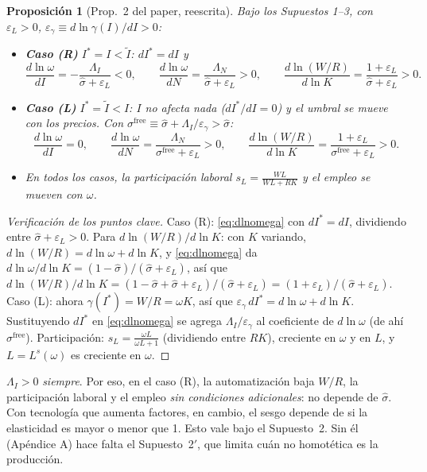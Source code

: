 \documentclass[11pt,a4paper]{article}
\theoremstyle{definition}
\theoremstyle{plain}
\newtheorem{proposicion}{Proposición}
\theoremstyle{remark}
\numberwithin{equation}{section}
\newcommand{\sh}{\hat\sigma}
\newcommand{\It}{\tilde I}
\newcommand{\Is}{I^{*}}
\newcommand{\sfree}{\sigma^{\mathrm{free}}}
\newcommand{\eps}{\varepsilon}
\begin{document}
\begin{proposicion}[Prop.~2 del paper, reescrita]
Bajo los Supuestos 1–3, con $\eps_L>0$, $\eps_\gamma\equiv d\ln\gamma(I)/dI>0$:
\begin{itemize}[nosep]
  \item \textbf{Caso (R)} $\Is=I<\It$: $d\Is=dI$ y
    \[\frac{d\ln\omega}{dI}=-\frac{\Lambda_I}{\sh+\eps_L}<0,\qquad \frac{d\ln\omega}{dN}=\frac{\Lambda_N}{\sh+\eps_L}>0,\qquad
      \frac{d\ln(W/R)}{d\ln K}=\frac{1+\eps_L}{\sh+\eps_L}>0.\]
  \item \textbf{Caso (L)} $\Is=\It<I$: $I$ no afecta nada ($d\Is/dI=0$) y el umbral se mueve con los precios. Con
    $\sfree\equiv\sh+\Lambda_I/\eps_\gamma>\sh$:
    \[\frac{d\ln\omega}{dI}=0,\qquad \frac{d\ln\omega}{dN}=\frac{\Lambda_N}{\sfree+\eps_L}>0,\qquad
      \frac{d\ln(W/R)}{d\ln K}=\frac{1+\eps_L}{\sfree+\eps_L}>0.\]
  \item En todos los casos, la participación laboral $s_L=\frac{WL}{WL+RK}$ y el empleo se mueven con $\omega$.
\end{itemize}
\end{proposicion}

\begin{proof}[Verificación de los puntos clave]
Caso (R): \eqref{eq:dlnomega} con $d\Is=dI$, dividiendo entre $\sh+\eps_L>0$. Para $d\ln(W/R)/d\ln K$: con $K$
variando, $d\ln(W/R)=d\ln\omega+d\ln K$, y \eqref{eq:dlnomega} da $d\ln\omega/d\ln K=(1-\sh)/(\sh+\eps_L)$, así que
$d\ln(W/R)/d\ln K=(1-\sh+\sh+\eps_L)/(\sh+\eps_L)=(1+\eps_L)/(\sh+\eps_L)$.
Caso (L): ahora $\gamma(\Is)=W/R=\omega K$, así que $\eps_\gamma\,d\Is=d\ln\omega+d\ln K$. Sustituyendo $d\Is$ en
\eqref{eq:dlnomega} se agrega $\Lambda_I/\eps_\gamma$ al coeficiente de $d\ln\omega$ (de ahí $\sfree$).
Participación: $s_L=\frac{\omega L}{\omega L+1}$ (dividiendo entre $RK$), creciente en $\omega$ y en $L$, y
$L=L^s(\omega)$ es creciente en $\omega$.
\end{proof}

\begin{nota}[Lectura]
$\Lambda_I>0$ \emph{siempre}. Por eso, en el caso (R), la automatización baja $W/R$, la participación laboral y el
empleo \emph{sin condiciones adicionales}: no depende de $\sh$. Con tecnología que aumenta factores, en cambio, el
sesgo depende de si la elasticidad es mayor o menor que 1. Esto vale bajo el Supuesto~2. Sin él (Apéndice A) hace
falta el Supuesto~2$'$, que limita cuán no homotética es la producción.
\end{nota}
\end{document}
